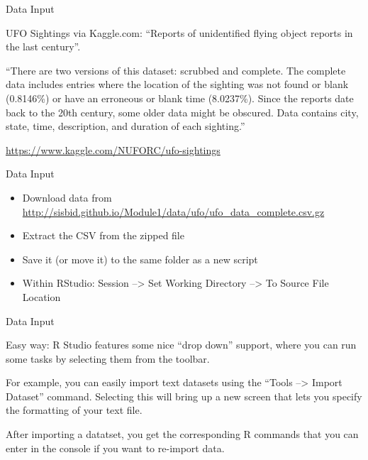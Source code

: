 \documentclass[
  ignorenonframetext,
]{beamer}
\providecommand{\tightlist}{%
  \setlength{\itemsep}{0pt}\setlength{\parskip}{0pt}}
\begin{document}
\begin{frame}{Data Input}
\protect\hypertarget{data-input-1}{}

UFO Sightings via Kaggle.com: ``Reports of unidentified flying object
reports in the last century''.

``There are two versions of this dataset: scrubbed and complete. The
complete data includes entries where the location of the sighting was
not found or blank (0.8146\%) or have an erroneous or blank time
(8.0237\%). Since the reports date back to the 20th century, some older
data might be obscured. Data contains city, state, time, description,
and duration of each sighting.''

\url{https://www.kaggle.com/NUFORC/ufo-sightings}

\end{frame}

\begin{frame}{Data Input}
\protect\hypertarget{data-input-2}{}

\begin{itemize}
\tightlist
\item
  Download data from
  \url{http://sisbid.github.io/Module1/data/ufo/ufo_data_complete.csv.gz}
\item
  Extract the CSV from the zipped file
\item
  Save it (or move it) to the same folder as a new script
\item
  Within RStudio: Session --\textgreater{} Set Working Directory
  --\textgreater{} To Source File Location
\end{itemize}

\end{frame}

\begin{frame}{Data Input}
\protect\hypertarget{data-input-3}{}

Easy way: R Studio features some nice ``drop down'' support, where you
can run some tasks by selecting them from the toolbar.

For example, you can easily import text datasets using the ``Tools
--\textgreater{} Import Dataset'' command. Selecting this will bring up
a new screen that lets you specify the formatting of your text file.

After importing a datatset, you get the corresponding R commands that
you can enter in the console if you want to re-import data.

\end{frame}
\end{document}
